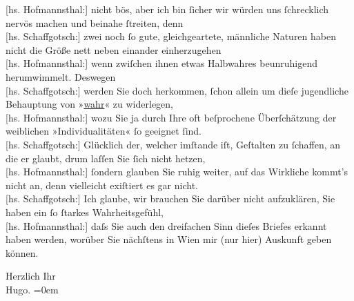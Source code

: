 \pstart
           {\pb}{[}hs. Hofmannsthal:{]} nicht bös, aber ich bin{ }ſicher wir würden uns { }ſchrecklich nervös machen und beinahe{ }ſtreiten, denn {\\}{[}hs. Schaffgotsch:{]} zwei noch{ }ſo gute, gleichgeartete, männliche Naturen
               haben nicht die Größe nett neben einander einherzugehen {\\}{[}hs. Hofmannsthal:{]} wenn zwiſchen ihnen etwas Halbwahres beunruhigend
               herumwimmelt. Deswegen {\\}{[}hs. Schaffgotsch:{]} werden Sie doch herkommen,{ }ſchon allein um dieſe jugendliche Behauptung von »\uline{wahr}« zu widerlegen, {\\}{[}hs. Hofmannsthal:{]} wozu Sie ja durch Ihre oft beſprochene Überſchätzung
               der weiblichen »Individualitäten«{ }ſo geeignet{ }ſind. {\\}{[}hs. Schaffgotsch:{]} Glücklich der, welcher imſtande iſt, Geſtalten zu{ }ſchaffen, an die er glaubt, drum laſſen Sie{ }ſich nicht hetzen, {\\}{[}hs. Hofmannsthal:{]} ſondern glauben Sie ruhig weiter, auf das Wirkliche
               kommt’s nicht an, denn vielleicht exiſtiert es gar nicht. {\\}{[}hs. Schaffgotsch:{]} Ich glaube, wir brauchen Sie darüber nicht
               aufzuklären, Sie haben ein{ }ſo{ }ſtarkes Wahrheitsgefühl, {\\}{[}hs. Hofmannsthal:{]} daſs Sie auch den dreifachen Sinn dieſes Briefes
               erkannt haben werden, worüber Sie nächſtens in Wien mir (nur hier) Auskunft geben können.\pend
           
\pstart
           Herzlich Ihr{\\[\baselineskip]}\spacefill\mbox{Hugo.}\pend
           \leftskip=0em{}\endnumbering{}  \newcommand{\dateiname}{L00580}\newcommand{\titel}{Hugo von Hofmannsthal und Hermine Benedict an Arthur Schnitzler, 21. [8. 1896]}\newcommand{\editorInnen}{Martin Anton Müller und Gerd-Hermann Susen}
